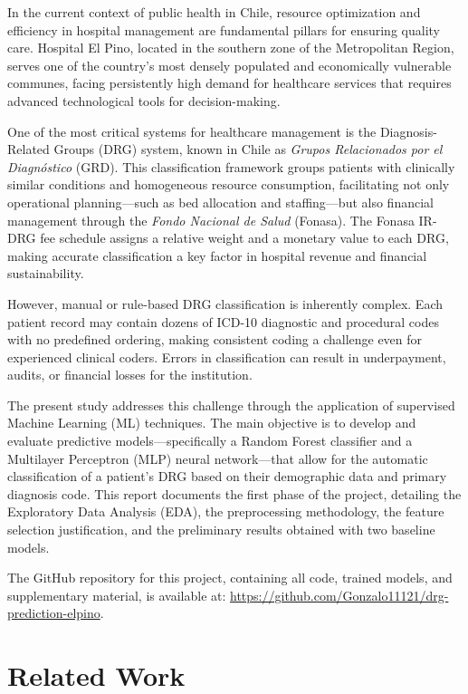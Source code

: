 \documentclass{IEEEtran}
\begin{document}
In the current context of public health in Chile, resource optimization and efficiency in hospital management are fundamental pillars for ensuring quality care. Hospital El Pino, located in the southern zone of the Metropolitan Region, serves one of the country's most densely populated and economically vulnerable communes, facing persistently high demand for healthcare services that requires advanced technological tools for decision-making.

One of the most critical systems for healthcare management is the Diagnosis-Related Groups (DRG) system, known in Chile as \textit{Grupos Relacionados por el Diagn\'ostico} (GRD). This classification framework groups patients with clinically similar conditions and homogeneous resource consumption, facilitating not only operational planning---such as bed allocation and staffing---but also financial management through the \textit{Fondo Nacional de Salud} (Fonasa). The Fonasa IR-DRG fee schedule assigns a relative weight and a monetary value to each DRG, making accurate classification a key factor in hospital revenue and financial sustainability.

However, manual or rule-based DRG classification is inherently complex. Each patient record may contain dozens of ICD-10 diagnostic and procedural codes with no predefined ordering, making consistent coding a challenge even for experienced clinical coders. Errors in classification can result in underpayment, audits, or financial losses for the institution.

The present study addresses this challenge through the application of supervised Machine Learning (ML) techniques. The main objective is to develop and evaluate predictive models---specifically a Random Forest classifier and a Multilayer Perceptron (MLP) neural network---that allow for the automatic classification of a patient's DRG based on their demographic data and primary diagnosis code. This report documents the first phase of the project, detailing the Exploratory Data Analysis (EDA), the preprocessing methodology, the feature selection justification, and the preliminary results obtained with two baseline models.

The GitHub repository for this project, containing all code, trained models, and supplementary material, is available at: \url{https://github.com/Gonzalo11121/drg-prediction-elpino}.

\section{Related Work}
\end{document}
